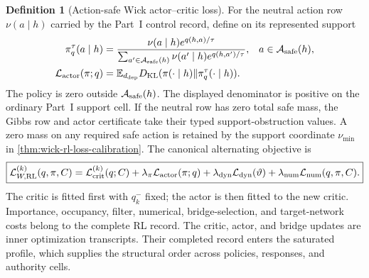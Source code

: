 \documentclass[11pt]{article}
\numberwithin{section}{part}
\theoremstyle{plain}
\theoremstyle{definition}
\newtheorem{definition}[definition]{Definition}
\theoremstyle{remark}
\begin{document}
\begin{definition}[Action-safe Wick actor--critic loss]
For the neutral action row \(\nu(a\mid h)\) carried by the Part~I control
record, define on its represented support
\begin{equation}
\label{eq:wick-rl-gibbs-policy}
\begin{aligned}
 \pi_q^\tau(a\mid h)
 &=\frac{\nu(a\mid h)e^{q(h,a)/\tau}}
 {\sum_{a'\in\mathcal A_{\rm safe}(h)}
   \nu(a'\mid h)e^{q(h,a')/\tau}},
 &&a\in\mathcal A_{\rm safe}(h),\\
 \mathcal L_{\rm actor}(\pi;q)
 &=\mathbb E_{d_{\rm dep}}
 D_{\rm KL}(\pi(\cdot\mid h)\Vert\pi_q^\tau(\cdot\mid h)).
\end{aligned}
\end{equation}
The policy is zero outside \(\mathcal A_{\rm safe}(h)\).  The displayed
denominator is positive on the ordinary Part~I support cell.  If the neutral
row has zero total safe mass, the Gibbs row and actor certificate take their
typed support-obstruction values.  A zero mass on any required safe action is
retained by the support coordinate \(\nu_{\min}\) in
\cref{thm:wick-rl-loss-calibration}.
The canonical alternating objective is
\begin{equation}
 \label{eq:wick-rl-composite-loss}
 \boxed{
 \mathcal L_{W,{\rm RL}}^{(k)}(q,\pi,C)
 =\mathcal L_{\rm crit}^{(k)}(q;C)
 +\lambda_\pi\mathcal L_{\rm actor}(\pi;q)
 +\lambda_{\rm dyn}\mathcal L_{\rm dyn}(\vartheta)
 +\lambda_{\rm num}\mathcal L_{\rm num}(q,\pi,C).
 }
\end{equation}
The critic is fitted first with \(q_k^-\) fixed; the actor is then fitted to
the new critic.  Importance, occupancy, filter, numerical, bridge-selection,
and target-network costs belong to the complete RL record.
The critic, actor, and bridge updates are inner optimization transcripts.
Their completed record enters the saturated profile, which supplies the
structural order across policies, responses, and authority cells.
\end{definition}
\end{document}
